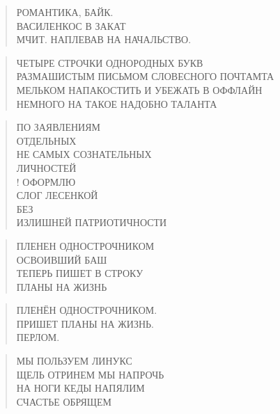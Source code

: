 \poemtitle{***}
\begin{verse}
РОМАНТИКА, БАЙК.\\
ВАСИЛЕНКОС В ЗАКАТ\\
МЧИТ. НАПЛЕВАВ НА НАЧАЛЬСТВО.
\end{verse}

\poemtitle{***}
\begin{verse}
ЧЕТЫРЕ СТРОЧКИ ОДНОРОДНЫХ БУКВ\\
РАЗМАШИСТЫМ ПИСЬМОМ СЛОВЕСНОГО ПОЧТАМТА\\
МЕЛЬКОМ НАПАКОСТИТЬ И УБЕЖАТЬ В ОФФЛАЙН\\
НЕМНОГО НА ТАКОЕ НАДОБНО ТАЛАНТА
\end{verse}

\poemtitle{***}
\begin{verse}
ПО ЗАЯВЛЕНИЯМ\\
   ОТДЕЛЬНЫХ\\
      НЕ САМЫХ СОЗНАТЕЛЬНЫХ \\
            ЛИЧНОСТЕЙ\\!
ОФОРМЛЮ \\
   СЛОГ ЛЕСЕНКОЙ\\
      БЕЗ \\
            ИЗЛИШНЕЙ ПАТРИОТИЧНОСТИ
\end{verse}

\poemtitle{***}
\begin{verse}
ПЛЕНЕН ОДНОСТРОЧНИКОМ\\
ОСВОИВШИЙ  БАШ\\
ТЕПЕРЬ ПИШЕТ В СТРОКУ\\
ПЛАНЫ НА ЖИЗНЬ
\end{verse}

\poemtitle{***}
\begin{verse}
ПЛЕНЁН ОДНОСТРОЧНИКОМ.\\
ПРИШЕТ ПЛАНЫ НА ЖИЗНЬ.\\
ПЕРЛОМ.
\end{verse}

\poemtitle{***}
\begin{verse}
МЫ ПОЛЬЗУЕМ ЛИНУКС\\
ЩЕЛЬ ОТРИНЕМ МЫ НАПРОЧЬ\\
НА НОГИ КЕДЫ НАПЯЛИМ\\
СЧАСТЬЕ ОБРЯЩЕМ
\end{verse}

